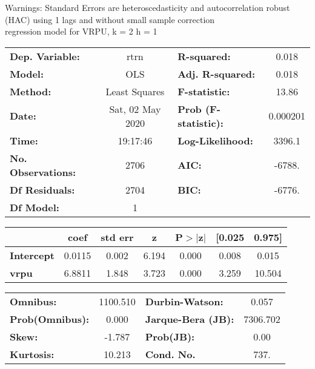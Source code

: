 Warnings: \newline
 [1] Standard Errors are heteroscedasticity and autocorrelation robust (HAC) using 1 lags and without small sample correction\\ 

regression model for VRPU, k = 2 h = 1\begin{center}
\begin{tabular}{lclc}
\toprule
\textbf{Dep. Variable:}    &       rtrn       & \textbf{  R-squared:         } &     0.018   \\
\textbf{Model:}            &       OLS        & \textbf{  Adj. R-squared:    } &     0.018   \\
\textbf{Method:}           &  Least Squares   & \textbf{  F-statistic:       } &     13.86   \\
\textbf{Date:}             & Sat, 02 May 2020 & \textbf{  Prob (F-statistic):} &  0.000201   \\
\textbf{Time:}             &     19:17:46     & \textbf{  Log-Likelihood:    } &    3396.1   \\
\textbf{No. Observations:} &        2706      & \textbf{  AIC:               } &    -6788.   \\
\textbf{Df Residuals:}     &        2704      & \textbf{  BIC:               } &    -6776.   \\
\textbf{Df Model:}         &           1      & \textbf{                     } &             \\
\bottomrule
\end{tabular}
\begin{tabular}{lcccccc}
                   & \textbf{coef} & \textbf{std err} & \textbf{z} & \textbf{P$> |$z$|$} & \textbf{[0.025} & \textbf{0.975]}  \\
\midrule
\textbf{Intercept} &       0.0115  &        0.002     &     6.194  &         0.000        &        0.008    &        0.015     \\
\textbf{vrpu}      &       6.8811  &        1.848     &     3.723  &         0.000        &        3.259    &       10.504     \\
\bottomrule
\end{tabular}
\begin{tabular}{lclc}
\textbf{Omnibus:}       & 1100.510 & \textbf{  Durbin-Watson:     } &    0.057  \\
\textbf{Prob(Omnibus):} &   0.000  & \textbf{  Jarque-Bera (JB):  } & 7306.702  \\
\textbf{Skew:}          &  -1.787  & \textbf{  Prob(JB):          } &     0.00  \\
\textbf{Kurtosis:}      &  10.213  & \textbf{  Cond. No.          } &     737.  \\
\bottomrule
\end{tabular}
\end{center}

